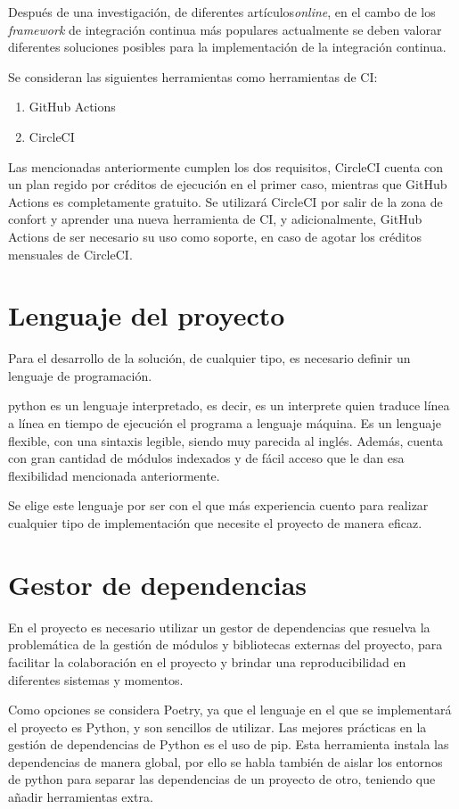 Después de una investigación, de diferentes artículos\emph{online}, en el cambo de los \emph{framework} de integración continua más populares actualmente se deben valorar diferentes soluciones posibles para la implementación de la integración continua. \cite{CIKumar2023}\cite{CITaylor2023}\cite{CIRoddewig2023}

Se consideran las siguientes herramientas como herramientas de CI:
\begin{enumerate}
    \item GitHub Actions
    \item CircleCI
\end{enumerate}

Las mencionadas anteriormente cumplen los dos requisitos, CircleCI cuenta con un plan regido por créditos de ejecución en el primer caso, mientras que GitHub Actions es completamente gratuito. Se utilizará CircleCI por salir de la zona de confort y aprender una nueva herramienta de CI, y adicionalmente, GitHub Actions de ser necesario su uso como soporte, en caso de agotar los créditos mensuales de CircleCI. 

\section{Lenguaje del proyecto}
Para el desarrollo de la solución, de cualquier tipo, es necesario definir un lenguaje de programación. 

\Gls{python} es un lenguaje interpretado, es decir, es un interprete quien traduce línea a línea en tiempo de ejecución el programa a lenguaje máquina. Es un lenguaje flexible, con una sintaxis legible, siendo muy parecida al inglés. Además, cuenta con gran cantidad de módulos indexados y de fácil acceso que le dan esa flexibilidad mencionada anteriormente.

Se elige este lenguaje por ser con el que más experiencia cuento para realizar cualquier tipo de implementación que necesite el proyecto de manera eficaz.

\section{Gestor de dependencias}
En el proyecto es necesario utilizar un gestor de dependencias que resuelva la problemática de la gestión de módulos y bibliotecas externas del proyecto, para facilitar la colaboración en el proyecto y brindar una reproducibilidad en diferentes sistemas y momentos. 

Como opciones se considera Poetry, ya que el lenguaje en el que se implementará el proyecto es \Gls{Python}, y son sencillos de utilizar. Las mejores prácticas en la gestión de dependencias de \Gls{Python} es el uso de pip. Esta herramienta instala las dependencias de manera global, por ello se habla también de aislar los entornos de \Gls{python} para separar las dependencias de un proyecto de otro, teniendo que añadir herramientas extra. 

